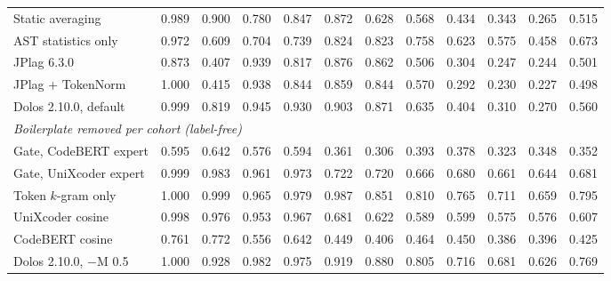 \begin{table}[t]
\begin{tabular}{l|cccc|ccccccc}
Static averaging & 0.989 & 0.900 & 0.780 & 0.847 & 0.872 & 0.628 & 0.568 & 0.434 & 0.343 & 0.265 & 0.515 \\
AST statistics only & 0.972 & 0.609 & 0.704 & 0.739 & 0.824 & 0.823 & 0.758 & 0.623 & 0.575 & 0.458 & 0.673 \\
JPlag 6.3.0 & 0.873 & 0.407 & 0.939 & 0.817 & 0.876 & 0.862 & 0.506 & 0.304 & 0.247 & 0.244 & 0.501 \\
JPlag + TokenNorm & 1.000 & 0.415 & 0.938 & 0.844 & 0.859 & 0.844 & 0.570 & 0.292 & 0.230 & 0.227 & 0.498 \\
Dolos 2.10.0, default & 0.999 & 0.819 & 0.945 & 0.930 & 0.903 & 0.871 & 0.635 & 0.404 & 0.310 & 0.270 & 0.560 \\
\midrule
\multicolumn{12}{l}{\emph{Boilerplate removed per cohort (label-free)}} \\
Gate, CodeBERT expert & 0.595 & 0.642 & 0.576 & 0.594 & 0.361 & 0.306 & 0.393 & 0.378 & 0.323 & 0.348 & 0.352 \\
Gate, UniXcoder expert & 0.999 & 0.983 & 0.961 & 0.973 & 0.722 & 0.720 & 0.666 & 0.680 & 0.661 & 0.644 & 0.681 \\
Token $k$-gram only & 1.000 & 0.999 & 0.965 & 0.979 & 0.987 & 0.851 & 0.810 & 0.765 & 0.711 & 0.659 & 0.795 \\
UniXcoder cosine & 0.998 & 0.976 & 0.953 & 0.967 & 0.681 & 0.622 & 0.589 & 0.599 & 0.575 & 0.576 & 0.607 \\
CodeBERT cosine & 0.761 & 0.772 & 0.556 & 0.642 & 0.449 & 0.406 & 0.464 & 0.450 & 0.386 & 0.396 & 0.425 \\
Dolos 2.10.0, $-$M 0.5 & 1.000 & 0.928 & 0.982 & 0.975 & 0.919 & 0.880 & 0.805 & 0.716 & 0.681 & 0.626 & 0.769 \\
\bottomrule
\end{tabular}
\end{table}